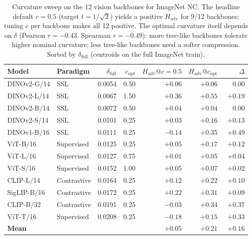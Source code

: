 \begin{table}[t]
\centering\scriptsize
\caption{Curvature sweep on the 12 vision backbones for ImageNet NC. The headline default $c{=}0.5$ (target $t{=}1/\sqrt{2}$) yields a positive $H_\text{adv}$ for 9/12 backbones; tuning $c$ per backbone makes all 12 positive. The optimal curvature itself depends on $\delta$ (Pearson $r = -0.43$, Spearman $r = -0.49$): more tree-like backbones tolerate higher nominal curvature; less tree-like backbones need a softer compression. Sorted by $\delta_\text{full}$ (centroids on the full ImageNet train).}
\label{tab:curvature}
\begin{tabular}{llrrrrr}
\toprule
Model & Paradigm & $\delta_\text{full}$ & $c_\text{opt}$ & $H_\text{adv}@c{=}0.5$ & $H_\text{adv}@c_\text{opt}$ & $\Delta$ \\
\midrule
DINOv2-G/14   & SSL          & 0.0054 & 0.50 & $+0.06$ & $+0.06$ & $\phantom{+}0.00$ \\
DINOv2-L/14   & SSL          & 0.0067 & 1.50 & $+0.36$ & $\mathbf{+0.55}$ & $+0.19$ \\
DINOv2-B/14   & SSL          & 0.0072 & 0.50 & $+0.04$ & $+0.04$ & $\phantom{+}0.00$ \\
DINOv2-S/14   & SSL          & 0.0101 & 0.25 & $+0.03$ & $+0.16$ & $+0.13$ \\
DINOv1-B/16   & SSL          & 0.0111 & 0.25 & $-0.14$ & $+0.35$ & $+0.49$ \\
ViT-B/16      & Supervised   & 0.0125 & 0.25 & $+0.05$ & $+0.17$ & $+0.12$ \\
ViT-L/16      & Supervised   & 0.0127 & 0.75 & $+0.01$ & $+0.05$ & $+0.04$ \\
ViT-S/16      & Supervised   & 0.0152 & 1.00 & $+0.05$ & $+0.07$ & $+0.02$ \\
CLIP-L/14     & Contrastive  & 0.0164 & 0.25 & $+0.12$ & $+0.22$ & $+0.10$ \\
SigLIP-B/16   & Contrastive  & 0.0172 & 0.25 & $+0.22$ & $+0.31$ & $+0.09$ \\
CLIP-B/32     & Contrastive  & 0.0191 & 0.25 & $-0.03$ & $+0.34$ & $+0.37$ \\
ViT-T/16      & Supervised   & 0.0208 & 0.25 & $-0.18$ & $+0.15$ & $+0.33$ \\
\midrule
\textbf{Mean} &              &        &      & $+0.05$ & $\mathbf{+0.21}$ & $+0.16$ \\
\bottomrule
\end{tabular}
\end{table}
